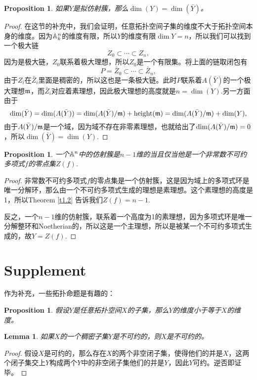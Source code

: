 \documentclass[9pt]{extbook}
\theoremstyle{plain}%
\newtheorem{pro}[defi]{Proposition}%
\newtheorem{lem}[defi]{Lemma}%
\begin{document}
\begin{pro}
如果$Y$是拟仿射簇，那么$\dim(Y)=\dim(\bar{Y})$。
\end{pro}
\begin{proof}在这节的补充中，我们会证明，任意拓扑空间子集的维度不大于拓扑空间本身的维度。因为$\mathbb{A}^n_k$的维度有限，所以$Y$的维度有限$\dim Y=n$，所以我们可以找到一个极大链
\[
	Z_0\subset \cdots \subset Z_n,
\]
因为是极大链，$Z_0$联系着极大理想，所以$Z_0$是一个有限集。将上面的链取闭包有
\[
	P=\bar{Z}_0\subset \cdots \subset \bar{Z}_n,
\]
由于$Z_i$在$\bar{Z}_i$里面是稠密的，所以这也是一条极大链。此时$P$联系着$A(\bar{Y})$的一个极大理想$\mathfrak{m}$，而$\bar{Z}_i$对应着素理想，因此极大理想的高度就是$n=\dim(Y)$.另一方面由于
\[
	\dim (\bar{Y})=\dim (A(\bar{Y}))=\dim (A(\bar{Y})/\mathfrak{m}) +\operatorname{height}(\mathfrak{m})=\dim (A(\bar{Y})/\mathfrak{m}) +\dim(Y),
\]
由于$A(\bar{Y})/\mathfrak{m}$是一个域，因为域不存在非零素理想，也就给出了$\dim (A(\bar{Y})/\mathfrak{m})=0$，所以$\dim (\bar{Y})=\dim(Y)$.
\end{proof}
\begin{pro}
一个$\mathbb{A}^n$中的仿射簇是$n-1$维的当且仅当他是一个非常数不可约多项式$f$的零点集$Z(f)$.
\end{pro}
\begin{proof}
非常数不可约多项式$f$的零点集是一个仿射簇，这是因为域上的多项式环是唯一分解环，那么由一个不可约多项式生成的理想是素理想。这个素理想的高度是1，所以Theorem \ref{t1.2} 告诉我们$Z(f)=n-1$.

反之，一个$n-1$维的仿射簇，联系着一个高度为1的素理想，因为多项式环是唯一分解整环和Noetherian的，所以这是一个主理想，所以是被某一个不可约多项式生成的，故$Y=Z(f)$.
\end{proof}

\section*{Supplement}
作为补充，一些拓扑命题是有趣的：
\begin{pro}
	假设$Y$是任意拓扑空间$X$的子集，那么$Y$的维度小于等于$X$的维度。
	\label{p1.8}
\end{pro}

\begin{lem}如果$X$的一个稠密子集$Y$是不可约的，则$X$是不可约的。
\label{l1.1}
\end{lem}
\begin{proof}
假设$X$是可约的，那么存在$X$的两个非空闭子集，使得他们的并是$X$，这两个闭子集交上$Y$构成两个$Y$中的非空闭子集他们的并是$Y$，因此$Y$可约。逆否即证毕。
\end{proof}
\end{document}
